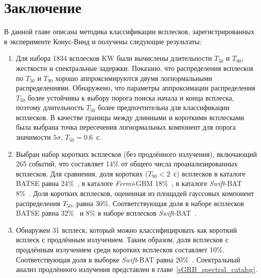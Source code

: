 \section{Заключение} \label{sec:Conclision}
В данной главе описана методика классификации всплесков, зарегистрированных в эксперименте
Конус-Винд и получены следующие результаты:

\begin{enumerate}
\item Для набора 1834 всплесков KW были вычислены длительности $T_{50}$ и $T_{90}$, жесткости 
и спектральные задержки. Показано, что распределения 
всплесков по $T_{50}$ и $T_{90}$ хорошо аппроксимируются двумя логнормальными 
распределениями. Обнаружено, что параметры аппроксимации распределения $T_{50}$ 
более устойчивы к выбору порога поиска начала и конца всплеска, поэтому длительность 
$T_{50}$ более предпочтительна для классификации всплесков. В качестве границы между 
длинными и короткими всплесками была выбрана точка пересечения логнормальных компонент 
для порога значимости $5\sigma$, $T_{50} = 0.6$~с. 

\item Выбран набор коротких всплесков (без продлённого излучения), включающий 265 событий, 
что составляет 14\% от общего числа проанализированных всплесков. Для сравнения, 
доля коротких ($T_{90}<2$~с) всплесков в каталоге BATSE равна 24\%~\citep{Meegan_2001}, %
в каталоге \textit{Fermi}-GBM 18\%~\citep{Paciesas_2012}, 
в каталоге \textit{Swift}-BAT 8\%~\citep{Sakamoto_2011ApJS}. 
Доля коротких всплесков, оцененная из площадей гауссовых компонент 
распределения $T_{50}$, равна 30\%. Соответствующая доля в наборе всплесков BATSE равна 32\%~\citep{Horvath_2002} 
и 8\% в наборе всплесков \textit{Swift}-BAT~\citep{Horvath_2008}.  

\item Обнаружен 31 всплеск, который можно классифицировать как короткий 
всплеск с продлённым излучением. Таким образом, доля всплесков с продлённым 
излучением среди коротких всплесков составляет 10\%. Соответствующая доля 
в выборке \textit{Swift}-BAT равна 20\%~\citep{Sakamoto_2011ApJS}. 
Спектральный анализ продлённого излучения представлен в главе~\ref{sGRB_spectral_catalog}.


\end{enumerate}
